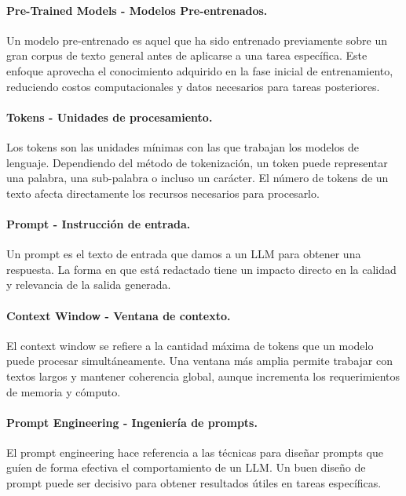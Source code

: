 \paragraph{Pre-Trained Models - Modelos Pre-entrenados.\parencite{pretrained}}
Un modelo pre-entrenado es aquel que ha sido entrenado previamente sobre un gran corpus de texto general antes de aplicarse a una tarea específica. Este enfoque aprovecha el conocimiento adquirido en la fase inicial de entrenamiento, reduciendo costos computacionales y datos necesarios para tareas posteriores.

\paragraph{Tokens - Unidades de procesamiento.\parencite{Grefenstette1999}}
Los tokens son las unidades mínimas con las que trabajan los modelos de lenguaje. Dependiendo del método de tokenización, un token puede representar una palabra, una sub-palabra o incluso un carácter. El número de tokens de un texto afecta directamente los recursos necesarios para procesarlo.

\paragraph{Prompt - Instrucción de entrada.\parencite{Schulhoff2025}}
Un prompt es el texto de entrada que damos a un LLM para obtener una respuesta. La forma en que está redactado tiene un impacto directo en la calidad y relevancia de la salida generada.

\paragraph{Context Window - Ventana de contexto.\parencite{context_window}}
El context window se refiere a la cantidad máxima de tokens que un modelo puede procesar simultáneamente. Una ventana más amplia permite trabajar con textos largos y mantener coherencia global, aunque incrementa los requerimientos de memoria y cómputo.

\paragraph{Prompt Engineering - Ingeniería de prompts.\parencite{Schulhoff2025}}
El prompt engineering hace referencia a las técnicas para diseñar prompts que guíen de forma efectiva el comportamiento de un LLM. Un buen diseño de prompt puede ser decisivo para obtener resultados útiles en tareas específicas.

